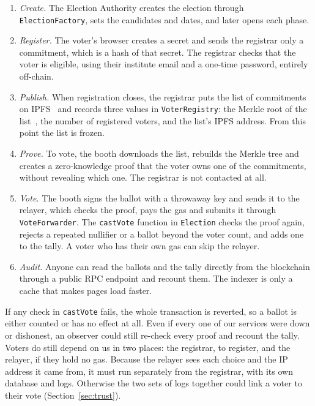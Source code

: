 \begin{enumerate}
  \item \emph{Create.} The Election Authority creates the election through
    \texttt{ElectionFactory}, sets the candidates and dates, and later opens
    each phase.
  \item \emph{Register.} The voter's browser creates a secret and sends the
    registrar only a commitment, which is a hash of that secret. The registrar
    checks that the voter is eligible, using their institute email and a
    one-time password, entirely off-chain.
  \item \emph{Publish.} When registration closes, the registrar puts the list
    of commitments on IPFS~\cite{ipfs} and records three values in
    \texttt{VoterRegistry}: the Merkle root of the list~\cite{merkle}, the
    number of registered voters, and the list's IPFS address. From this point
    the list is frozen.
  \item \emph{Prove.} To vote, the booth downloads the list, rebuilds the
    Merkle tree and creates a zero-knowledge proof that the voter owns one of
    the commitments, without revealing which one. The registrar is not
    contacted at all.
  \item \emph{Vote.} The booth signs the ballot with a throwaway key and sends
    it to the relayer, which checks the proof, pays the gas and submits it
    through \texttt{VoteForwarder}. The \texttt{castVote} function in
    \texttt{Election} checks the proof again, rejects a repeated nullifier or
    a ballot beyond the voter count, and adds one to the tally. A voter who
    has their own gas can skip the relayer.
  \item \emph{Audit.} Anyone can read the ballots and the tally directly from
    the blockchain through a public RPC endpoint and recount them. The indexer
    is only a cache that makes pages load faster.
\end{enumerate}

If any check in \texttt{castVote} fails, the whole transaction is reverted, so a
ballot is either counted or has no effect at all. Even if every one of our
services were down or dishonest, an observer could still re-check every proof
and recount the tally. Voters do still depend on us in two places: the
registrar, to register, and the relayer, if they hold no gas. Because the
relayer sees each choice and the IP address it came from, it must run
separately from the registrar, with its own database and logs. Otherwise the
two sets of logs together could link a voter to their vote
(Section~\ref{sec:trust}).

